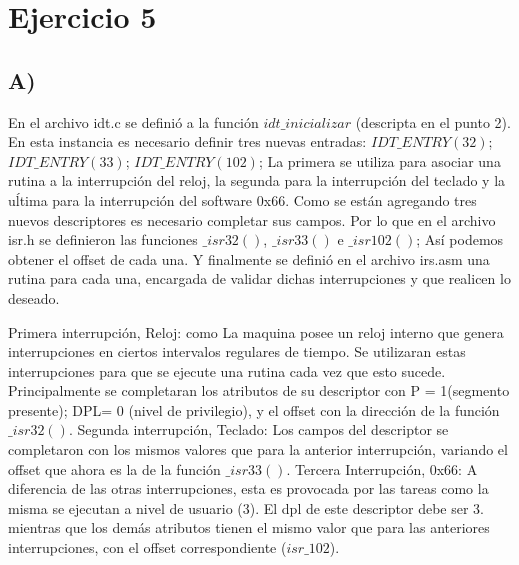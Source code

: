 \section{Ejercicio 5}


\subsection*{A)}

En el archivo idt.c se defini\'o a la funci\'on $idt\_inicializar$ (descripta en el punto 2).  En esta instancia es necesario definir tres nuevas entradas: $IDT\_ENTRY(32)$; $IDT\_ENTRY(33)$; $IDT\_ENTRY(102)$;\newline
 La primera se utiliza para asociar una rutina a la interrupci\'on del reloj, la segunda para la interrupci\'on del teclado y la u\'ltima para la interrupci\'on del software 0x66. 
Como se est\'an agregando tres nuevos descriptores es necesario completar sus campos.  Por lo que en el archivo isr.h se definieron las funciones $\_isr32()$, $\_isr33()$ e $\_isr102()$;  As\'i podemos obtener el offset de cada una. Y  finalmente se defini\'o en el archivo irs.asm una rutina para cada una, encargada de validar dichas interrupciones 
y que realicen lo deseado.\newline

Primera interrupci\'on, Reloj: \newline
como La maquina posee un reloj interno que genera interrupciones en ciertos intervalos regulares de tiempo. Se utilizaran estas interrupciones para que  se ejecute una rutina cada 
vez que esto sucede. Principalmente se completaran los atributos de su descriptor con P = 1(segmento presente); DPL= 0 (nivel de privilegio), y el offset con la direcci\'on de la 
funci\'on $\_isr32()$. \newline
Segunda interrupci\'on, Teclado: \newline
Los campos del descriptor se completaron con los mismos valores que para la anterior interrupci\'on, variando el offset que ahora es la de la funci\'on $\_isr33()$. \newline
Tercera Interrupci\'on, 0x66: \newline
A diferencia de las otras interrupciones, esta es provocada por las tareas como la misma se ejecutan a nivel de usuario (3). El dpl de este descriptor debe ser 3. mientras que los 
dem\'as atributos tienen el mismo valor que para las anteriores interrupciones, con el offset correspondiente ($isr\_102$).

